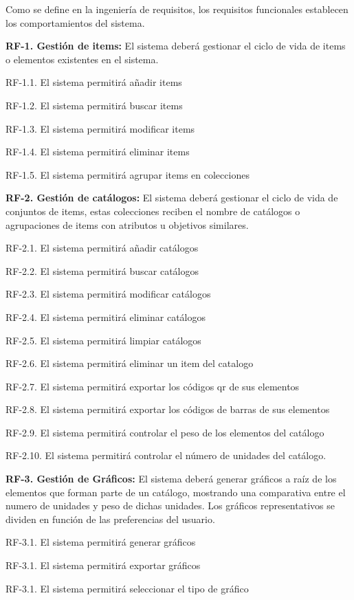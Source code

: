 \documentclass[a4paper,11pt]{book}
\begin{document}
Como se define en la ingeniería de requisitos, los requisitos funcionales establecen los comportamientos del sistema.

\textbf{RF-1. Gestión de items:} El sistema deberá gestionar el ciclo de vida de items o elementos existentes en el sistema.
   

	RF-1.1. El sistema permitirá añadir items

	RF-1.2. El sistema permitirá buscar items

	RF-1.3. El sistema permitirá modificar items

	RF-1.4. El sistema permitirá eliminar items

	RF-1.5. El sistema permitirá agrupar items en colecciones


\textbf{RF-2. Gestión de catálogos:} El sistema deberá gestionar el ciclo de vida de conjuntos de items, estas colecciones reciben el nombre de catálogos o agrupaciones de items con atributos u objetivos similares.   


	RF-2.1. El sistema permitirá añadir catálogos

	RF-2.2. El sistema permitirá buscar catálogos

	RF-2.3. El sistema permitirá modificar catálogos

	RF-2.4. El sistema permitirá eliminar catálogos

	RF-2.5. El sistema permitirá limpiar catálogos

	RF-2.6. El sistema permitirá eliminar un item del catalogo

	RF-2.7. El sistema permitirá exportar los códigos qr de sus elementos

	RF-2.8. El sistema permitirá exportar los códigos de barras de sus elementos

	RF-2.9. El sistema permitirá controlar el peso de los elementos del catálogo

	RF-2.10. El sistema permitirá controlar el número de unidades del catálogo. 
	

\textbf{RF-3. Gestión de Gráficos:} El sistema deberá generar gráficos a raíz de los elementos que forman parte de un catálogo, mostrando una comparativa entre el numero de unidades y peso de dichas unidades. Los gráficos representativos se dividen en función de las preferencias del usuario. 


	RF-3.1. El sistema permitirá generar gráficos
	
	RF-3.1. El sistema permitirá exportar gráficos
	
	RF-3.1. El sistema permitirá seleccionar el tipo de gráfico	
\end{document}
